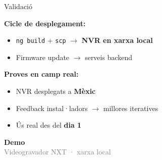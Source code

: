 
\begin{frame}{Validació}
  \vspace{0.5em}

  \textbf{Cicle de desplegament:}
  \begin{itemize}
    \item \texttt{ng build} + \texttt{scp} $\to$ \textbf{NVR en xarxa local}
    \item Firmware update $\to$ serveis backend
  \end{itemize}

  \vspace{0.7em}
  \textbf{Proves en camp real:}
  \begin{itemize}
    \item NVR desplegats a \textbf{Mèxic}
    \item Feedback instal·ladors $\to$ millores iteratives
    \item Ús real des del \textbf{dia 1}
  \end{itemize}

\end{frame}

\begin{frame}[plain]
  \begin{center}
    \vspace{2.5cm}
    {\Huge\bfseries\textcolor{upcblue}{Demo}}\\[1em]
    {\large\textcolor{gray}{Videogravador NXT · xarxa local}}
  \end{center}
\end{frame}
